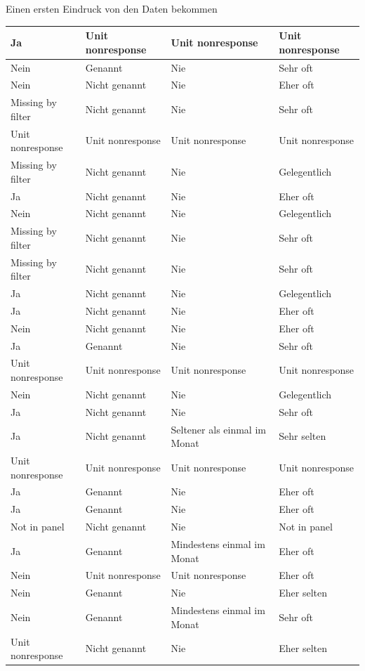 \documentclass[ignorenonframetext,]{beamer}
\begin{document}
\begin{frame}{Einen ersten Eindruck von den Daten bekommen}
\begin{tabular}{l|l|l|l}
\hline
Ja & Unit nonresponse & Unit nonresponse & Unit nonresponse\\
\hline
Nein & Genannt & Nie & Sehr oft\\
\hline
Nein & Nicht genannt & Nie & Eher oft\\
\hline
Missing by filter & Nicht genannt & Nie & Sehr oft\\
\hline
Unit nonresponse & Unit nonresponse & Unit nonresponse & Unit nonresponse\\
\hline
Missing by filter & Nicht genannt & Nie & Gelegentlich\\
\hline
Ja & Nicht genannt & Nie & Eher oft\\
\hline
Nein & Nicht genannt & Nie & Gelegentlich\\
\hline
Missing by filter & Nicht genannt & Nie & Sehr oft\\
\hline
Missing by filter & Nicht genannt & Nie & Sehr oft\\
\hline
Ja & Nicht genannt & Nie & Gelegentlich\\
\hline
Ja & Nicht genannt & Nie & Eher oft\\
\hline
Nein & Nicht genannt & Nie & Eher oft\\
\hline
Ja & Genannt & Nie & Sehr oft\\
\hline
Unit nonresponse & Unit nonresponse & Unit nonresponse & Unit nonresponse\\
\hline
Nein & Nicht genannt & Nie & Gelegentlich\\
\hline
Ja & Nicht genannt & Nie & Sehr oft\\
\hline
Ja & Nicht genannt & Seltener als einmal im Monat & Sehr selten\\
\hline
Unit nonresponse & Unit nonresponse & Unit nonresponse & Unit nonresponse\\
\hline
Ja & Genannt & Nie & Eher oft\\
\hline
Ja & Genannt & Nie & Eher oft\\
\hline
Not in panel & Nicht genannt & Nie & Not in panel\\
\hline
Ja & Genannt & Mindestens einmal im Monat & Eher oft\\
\hline
Nein & Unit nonresponse & Unit nonresponse & Eher oft\\
\hline
Nein & Genannt & Nie & Eher selten\\
\hline
Nein & Genannt & Mindestens einmal im Monat & Sehr oft\\
\hline
Unit nonresponse & Nicht genannt & Nie & Eher selten\\

\end{tabular}
\end{frame}
\end{document}
